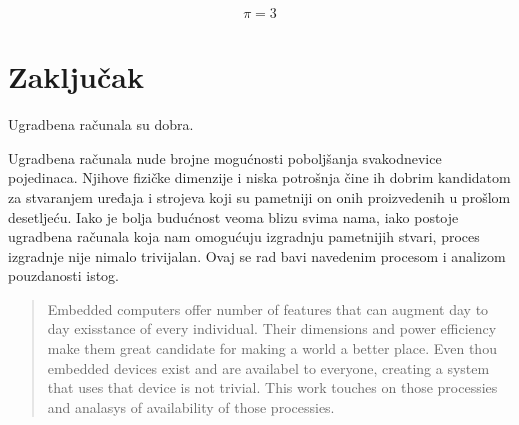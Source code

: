 \documentclass[times, utf8, diplomski]{diplomski}
\begin{document}
\begin{equation}
  \pi=3
\end{equation}

\chapter{Zaključak}
Ugradbena računala su dobra.

\nocite{*}



\lstlistoflistings

\begin{sazetak}
Ugradbena računala nude brojne mogućnosti poboljšanja svakodnevice pojedinaca. Njihove fizičke dimenzije i niska potrošnja čine ih dobrim kandidatom za stvaranjem uređaja i strojeva koji su pametniji on onih proizvedenih u prošlom desetljeću. Iako je bolja budućnost veoma blizu svima nama, iako postoje ugradbena računala koja nam omogućuju izgradnju pametnijih stvari, proces izgradnje nije nimalo trivijalan. Ovaj se rad bavi navedenim procesom i analizom pouzdanosti istog.

\end{sazetak}


\begin{abstract}
Embedded computers offer number of features that can augment day to day exisstance of every individual. Their dimensions and power efficiency make them great candidate for making a world a better place. Even thou embedded devices exist and are availabel to everyone, creating a system that uses that device is not trivial. This work touches on those processies and analasys of availability of those processies.

\end{abstract}
\end{document}
